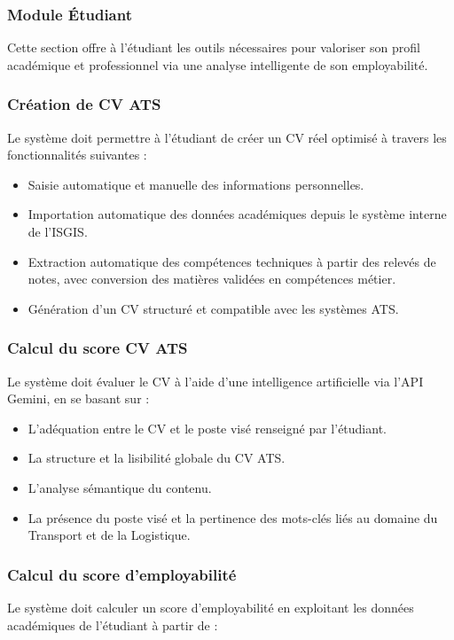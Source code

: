 \subsubsection{Module Étudiant}

Cette section offre à l'étudiant les outils nécessaires pour valoriser son profil académique et professionnel via une analyse intelligente de son employabilité.

\subsubsection*{Création de CV ATS}
Le système doit permettre à l'étudiant de créer un CV réel optimisé à travers les fonctionnalités suivantes :

\begin{itemize}
  \item Saisie automatique et manuelle des informations personnelles.
  \item Importation automatique des données académiques depuis le système interne de l'ISGIS.
  \item Extraction automatique des compétences techniques à partir des relevés de notes, avec conversion des matières validées en compétences métier.
  \item Génération d'un CV structuré et compatible avec les systèmes ATS.
\end{itemize}

\subsubsection*{Calcul du score CV ATS}
Le système doit évaluer le CV à l’aide d’une intelligence artificielle via l’API Gemini, en se basant sur :

\begin{itemize}
  \item L'adéquation entre le CV et le poste visé renseigné par l'étudiant.
  \item La structure et la lisibilité globale du CV ATS.
  \item L'analyse sémantique du contenu.
  \item La présence du poste visé et la pertinence des mots-clés liés au domaine du Transport et de la Logistique.
\end{itemize}

\subsubsection*{Calcul du score d'employabilité}
Le système doit calculer un score d'employabilité en exploitant les données académiques de l'étudiant à partir de :

